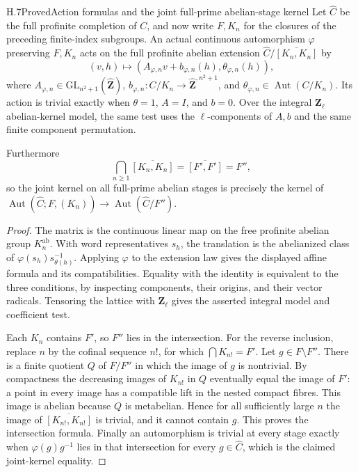 \begin{statement}{H.7}{Proved}{Action formulas and the joint full-prime abelian-stage kernel}
Let $\widehat C$ be the full profinite completion of $C$, and now
write $F,K_n$ for the closures of the preceding finite-index
subgroups. An actual continuous automorphism $\varphi$ preserving
$F,K_n$ acts on the full profinite abelian extension
$\widehat C/\overline{[K_n,K_n]}$ by
\[
 (v,h)\longmapsto(A_{\varphi,n}v+b_{\varphi,n}(h),
                         \theta_{\varphi,n}(h)),
\]
where $A_{\varphi,n}\in\mathrm{GL}_{n^2+1}(\widehat{\mathbf Z})$,
$b_{\varphi,n}:C/K_n\to\widehat{\mathbf Z}^{,n^2+1}$,
and $\theta_{\varphi,n}\in\operatorname{Aut}(C/K_n)$.
Its action is trivial exactly when $\theta=1$, $A=I$, and $b=0$.
Over the integral $\mathbf Z_\ell$ abelian-kernel model, the same
test uses the $\ell$-components of $A,b$ and the same finite
component permutation.

Furthermore
\[
 \bigcap_{n\geq1}\overline{[K_n,K_n]}
       =\overline{[F',F']}=F'',
\]
so the joint kernel on all full-prime abelian stages is precisely
the kernel of
$\operatorname{Aut}(\widehat C;F,(K_n))
\to\operatorname{Aut}(\widehat C/F'')$.
\end{statement}
\begin{proof}
The matrix is the continuous linear map on the free profinite
abelian group $K_n^{\mathrm{ab}}$. With word representatives
$s_h$, the translation is the abelianized class of
$\varphi(s_h)s_{\theta(h)}^{-1}$. Applying $\varphi$ to the
extension law gives the displayed affine formula and its
compatibilities. Equality with the identity is equivalent to the
three conditions, by inspecting components, their origins, and
their vector radicals. Tensoring the lattice with $\mathbf Z_\ell$
gives the asserted integral model and coefficient test.

Each $K_n$ contains $F'$, so $F''$ lies in the intersection.
For the reverse inclusion, replace $n$ by the cofinal sequence
$n!$, for which $\bigcap K_{n!}=F'$. Let $g\in F\setminus F''$.
There is a finite quotient $Q$ of $F/F''$ in which the image of
$g$ is nontrivial. By compactness the decreasing images of
$K_{n!}$ in $Q$ eventually equal the image of $F'$: a point in
every image has a compatible lift in the nested compact fibres.
This image is abelian because $Q$ is metabelian. Hence for all
sufficiently large $n$ the image of
$\overline{[K_{n!},K_{n!}]}$ is trivial, and it cannot contain
$g$. This proves the intersection formula. Finally an
automorphism is trivial at every stage exactly when
$\varphi(g)g^{-1}$ lies in that intersection for every
$g\in\widehat C$, which is the claimed joint-kernel equality.
\end{proof}

